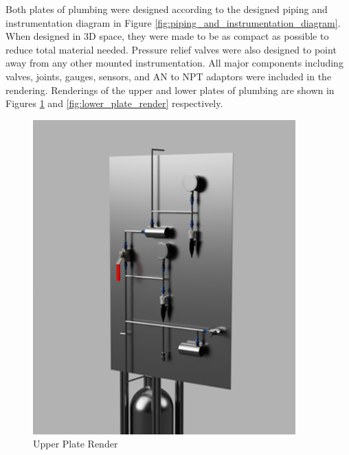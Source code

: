 \documentclass[9pt]{article} %
\numberwithin{equation}{section} %
\begin{document}
\hspace{\parindent} Both plates of plumbing were designed according to the designed piping and instrumentation diagram in Figure \ref{fig:piping_and_instrumentation_diagram}. When designed in 3D space, they were made to be as compact as possible to reduce total material needed. Pressure relief valves were also designed to point away from any other mounted instrumentation. All major components including valves, joints, gauges, sensors, and AN to NPT adaptors were included in the rendering. Renderings of the upper and lower plates of plumbing are shown in Figures \ref{fig:upper_plate_render} and \ref{fig:lower_plate_render} respectively.
\begin{figure}[!htb]
    \centering
    \begin{minipage}{0.49\textwidth}
        \centering
        \includegraphics[scale=0.5, width=0.9\textwidth]{upper_plate.png} %
        \caption{Upper Plate Render}
        \label{fig:upper_plate_render}
    \end{minipage}\hfill
    \begin{minipage}{0.49\textwidth}
        \centering

\end{minipage}
\end{figure}
\end{document}
